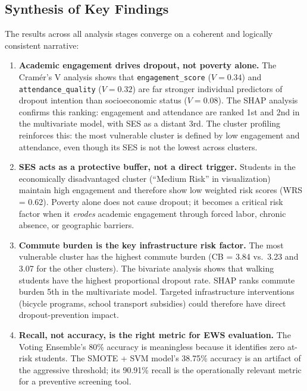 \subsection{Synthesis of Key Findings}

The results across all analysis stages converge on a coherent and logically consistent narrative:

\begin{enumerate}
    \item \textbf{Academic engagement drives dropout, not poverty alone.} The Cram\'{e}r's V analysis shows that \texttt{engagement\_score} ($V = 0.34$) and \texttt{attendance\_quality} ($V = 0.32$) are far stronger individual predictors of dropout intention than socioeconomic status ($V = 0.08$). The SHAP analysis confirms this ranking: engagement and attendance are ranked 1st and 2nd in the multivariate model, with SES as a distant 3rd. The cluster profiling reinforces this: the most vulnerable cluster is defined by low engagement and attendance, even though its SES is not the lowest across clusters.

    \item \textbf{SES acts as a protective buffer, not a direct trigger.} Students in the economically disadvantaged cluster (``Medium Risk'' in visualization) maintain high engagement and therefore show low weighted risk scores (WRS = 0.62). Poverty alone does not cause dropout; it becomes a critical risk factor when it \textit{erodes} academic engagement through forced labor, chronic absence, or geographic barriers.

    \item \textbf{Commute burden is the key infrastructure risk factor.} The most vulnerable cluster has the highest commute burden (CB = 3.84 vs.\ 3.23 and 3.07 for the other clusters). The bivariate analysis shows that walking students have the highest proportional dropout rate. SHAP ranks commute burden 5th in the multivariate model. Targeted infrastructure interventions (bicycle programs, school transport subsidies) could therefore have direct dropout-prevention impact.

    \item \textbf{Recall, not accuracy, is the right metric for EWS evaluation.} The Voting Ensemble's 80\% accuracy is meaningless because it identifies zero at-risk students. The SMOTE + SVM model's 38.75\% accuracy is an artifact of the aggressive threshold; its 90.91\% recall is the operationally relevant metric for a preventive screening tool.
\end{enumerate}

